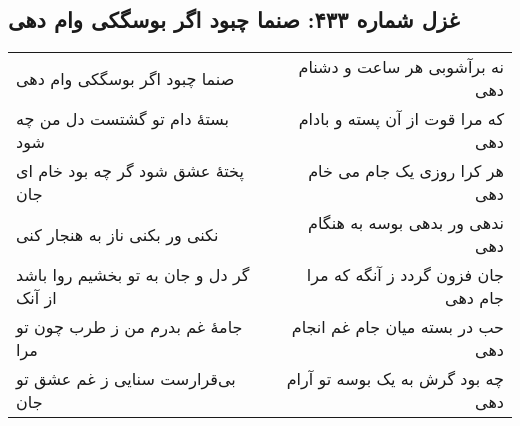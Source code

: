 \begin{center}
\section*{غزل شماره ۴۳۳: صنما چبود اگر بوسگکی وام دهی}
\label{sec:433}
\begin{longtable}{l p{0.5cm} r}
صنما چبود اگر بوسگکی وام دهی
&&
نه برآشوبی هر ساعت و دشنام دهی
\\
بستهٔ دام تو گشتست دل من چه شود
&&
که مرا قوت از آن پسته و بادام دهی
\\
پختهٔ عشق شود گر چه بود خام ای جان
&&
هر کرا روزی یک جام می خام دهی
\\
نکنی ور بکنی ناز به هنجار کنی
&&
ندهی ور بدهی بوسه به هنگام دهی
\\
گر دل و جان به تو بخشیم روا باشد از آنک
&&
جان فزون گردد ز آنگه که مرا جام دهی
\\
جامهٔ غم بدرم من ز طرب چون تو مرا
&&
حب در بسته میان جام غم انجام دهی
\\
بی‌قرارست سنایی ز غم عشق تو جان
&&
چه بود گرش به یک بوسه تو آرام دهی
\\
\end{longtable}
\end{center}
